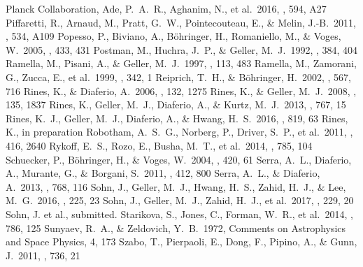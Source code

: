 \documentclass[iop, apj]{emulateapj}
\begin{document}
\begin{thebibliography}{}
 Planck Collaboration, Ade, P.~A.~R., Aghanim, N., et al.\ 2016, \aap, 594, A27    
 Piffaretti, R., Arnaud, M., Pratt, G.~W., Pointecouteau, E., \& Melin, J.-B.\ 2011, \aap, 534, A109 
 Popesso, P., Biviano, A., B{\"o}hringer, H., Romaniello, M., \& Voges, W.\ 2005, \aap, 433, 431 
 Postman, M., Huchra, J.~P., \& Geller, M.~J.\ 1992, \apj, 384, 404  
 Ramella, M., Pisani, A., \& Geller, M.~J.\ 1997, \aj, 113, 483 
 Ramella, M., Zamorani, G., Zucca, E., et al.\ 1999, \aap, 342, 1   
 Reiprich, T.~H., \& B{\"o}hringer, H.\ 2002, \apj, 567, 716  
 Rines, K., \& Diaferio, A.\ 2006, \aj, 132, 1275
 Rines, K., \& Geller, M.~J.\ 2008, \aj, 135, 1837    
 Rines, K., Geller, M.~J., Diaferio, A., \& Kurtz, M.~J.\ 2013, \apj, 767, 15  
 Rines, K.~J., Geller, M.~J., Diaferio, A., \& Hwang, H.~S.\ 2016, \apj, 819, 63  
 Rines, K., in preparation
 Robotham, A.~S.~G., Norberg, P., Driver, S.~P., et al.\ 2011, \mnras, 416, 2640  
 Rykoff, E.~S., Rozo, E., Busha, M.~T., et al.\ 2014, \apj, 785, 104 
 Schuecker, P., B{\"o}hringer, H., \& Voges, W.\ 2004, \aap, 420, 61 
 Serra, A.~L., Diaferio, A., Murante, G., \& Borgani, S.\ 2011, \mnras, 412, 800  
 Serra, A.~L., \& Diaferio, A.\ 2013, \apj, 768, 116 
 Sohn, J., Geller, M.~J., Hwang, H.~S., Zahid, H.~J., \& Lee, M.~G.\ 2016, \apjs, 225, 23  
 Sohn, J., Geller, M.~J., Zahid, H.~J., et al.\ 2017, \apjs, 229, 20  
 Sohn, J. et al., submitted.
 Starikova, S., Jones, C., Forman, W.~R., et al.\ 2014, \apj, 786, 125  
 Sunyaev, R.~A., \& Zeldovich, Y.~B.\ 1972, Comments on Astrophysics and Space Physics, 4, 173  
 Szabo, T., Pierpaoli, E., Dong, F., Pipino, A., \& Gunn, J.\ 2011, \apj, 736, 21  

\end{thebibliography}
\end{document}
